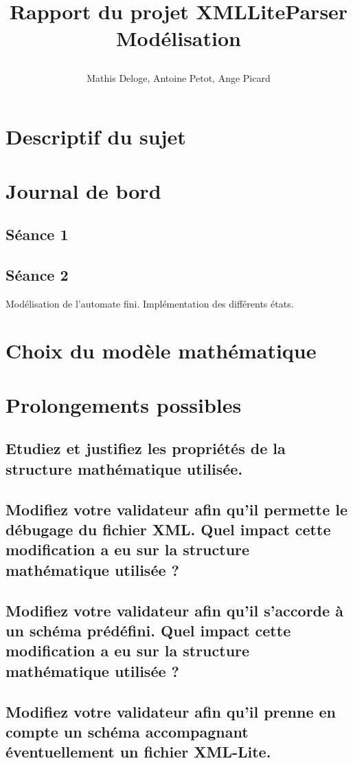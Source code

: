 \documentclass{article}
\title{%
    \begin{minipage}\linewidth
        \centering \bfseries
        Rapport du projet XMLLiteParser
        \vskip3pt
        \large Modélisation
    \end{minipage}
	
}
\author{Mathis Deloge, Antoine Petot, Ange Picard}
\date{}
\begin{document}
\renewcommand{\labelitemi}{$\bullet$}
\renewcommand{\labelitemii}{$\circ$}
\renewcommand{\labelitemiii}{$-$}
\renewcommand{\labelitemiv}{$\triangleright$}


\maketitle
\section{Descriptif du sujet}
\section{Journal de bord}
\subsection{Séance 1}
\subsection{Séance 2}
Modélisation de l'automate fini. Implémentation des différents états.
\section{Choix du modèle mathématique}
\section{Prolongements possibles}
\subsection{Etudiez et justifiez les propriétés de la structure mathématique utilisée.}
\subsection{Modifiez votre validateur afin qu’il permette le débugage du fichier XML. Quel impact cette modification a eu sur la structure mathématique utilisée ?}
\subsection{Modifiez votre validateur afin qu’il s’accorde à un schéma prédéfini. Quel impact cette modification a eu sur la structure mathématique utilisée ?}
\subsection{Modifiez votre validateur afin qu’il prenne en compte un schéma accompagnant éventuellement un fichier XML-Lite.}
\end{document}
